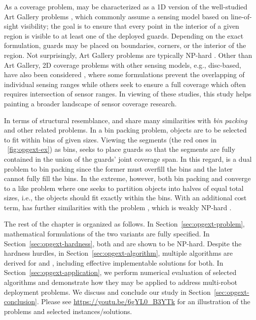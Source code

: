 As a coverage problem, \opg may be characterized as a 1D version 
of the well-studied Art Gallery problems  \cite{o1987art,shermer1992recent},
which commonly assume a sensing model based on line-of-sight 
visibility\cite{lozano1979algorithm}; the goal is to ensure that every point
in the  interior of a given region is visible to at least one of the deployed 
guards. Depending on the exact formulation, guards may be placed on 
boundaries, corners, or the interior of the region. Not surprisingly, Art
Gallery problems are typically NP-hard \cite{lee1986computational}. Other
than Art Gallery, 2D coverage problems with other sensing models, e.g., 
disc-based, have also been considered \cite{thue1910dichteste,hales2005proof,
drezner1995facility,cortes2004coverage,pavone2009equitable,
pierson2017adapting}, where some formulations prevent the overlapping 
of individual sensing ranges \cite{thue1910dichteste,hales2005proof} while 
others seek to ensure a full coverage which often requires intersection
of sensor ranges. 
%
In viewing of these studies, this study helps painting a broader landscape 
of sensor coverage research.

In terms of structural resemblance, \opglr and \opgmc share many similarities 
with {\em bin packing}  \cite{johnson1973near} and other related problems. 
In a bin packing problem, objects are to be selected to fit within bins of 
given sizes. Viewing the segments (the red ones in ~\ref{fig:opgext-ex}) as 
bins, \opg seeks to place guards so that the segments are fully contained in 
the union of the guards' joint coverage span. In this regard, \opg is a dual
problem to bin packing since the former must overfill the bins and the later 
cannot fully fill the bins. In the extreme, however, both bin packing and 
\opg converge to a \subsetsum \cite{karp1972reducibility} like problem where 
one seeks to partition objects into halves of equal total sizes, i.e., the 
objects should fit exactly within the bins. With an additional cost term, 
\opgmc has further similarities with the \ttkp problem \cite{lueker1975two}, 
which is weakly NP-hard \cite{dantzig1957discrete}.

The rest of the chapter is organized as follows. In Section~\ref{sec:opgext-problem},
mathematical formulations of the two \opg variants are fully specified. In
Section~\ref{sec:opgext-hardness}, both \opglr and \opgmc are shown to be 
NP-hard. Despite the hardness hurdles, in Section~\ref{sec:opgext-algorithm}, 
multiple algorithms are derived for \opglr and \opgmc, including effective
implementable solutions for both. In Section~\ref{sec:opgext-application},
we perform numerical evaluation of selected algorithms and demonstrate 
how they may be applied to address multi-robot deployment problems. We 
discuss and conclude our study in Section~\ref{sec:opgext-conclusion}. Please
see \url{https://youtu.be/6gYL0_B3YTk} for an illustration of the problems 
and selected instances/solutions. 